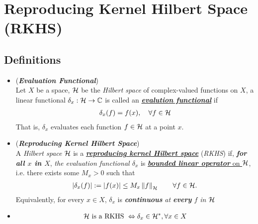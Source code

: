 \documentclass[11pt]{article}
\begin{document}
\section{Reproducing Kernel Hilbert Space (RKHS)}
\subsection{Definitions}
\begin{itemize}
\item \begin{definition} (\textbf{\emph{Evaluation Functional}})\\
Let $X$ be a space, ${\mathcal H}$ be the \emph{Hilbert space} of complex-valued functions on $X$,  a linear functional $\delta_x: {\mathcal H} \rightarrow {\mathbb C}$ is called an \underline{\emph{\textbf{evalution functional}}} if 
\begin{align*}
\delta_x(f) = f(x), \quad \forall f \in {\mathcal H}
\end{align*} That is, $\delta_x$ evaluates each function $f \in {\mathcal H}$ at a point $x$.
\end{definition}

\item \begin{definition} (\emph{\textbf{Reproducing Kernel Hilbert Space}})\\
A \emph{Hilbert space} ${\mathcal H}$ is a \underline{\emph{\textbf{reproducing kernel Hilbert space}}} (\emph{RKHS}) if, \emph{\textbf{for all $x$ in $X$}}, \emph{the evaluation functional $\delta_x$} is \underline{\emph{\textbf{bounded linear operator}} on ${\mathcal H}$}, i.e. there exists some $M_{x}>0$ such that
\begin{align*}
\left\lvert \delta_x(f)  \right\rvert := \left\lvert f(x) \right\rvert \le M_{x}\left\|f\right\|_{{\mathcal H}}\qquad \forall f\in {\mathcal H}.\,
\end{align*} 
Equivalently, for every $x\in X$, $\delta_x$ is \emph{\textbf{continuous}} \emph{at \textbf{every} $f$ in ${\mathcal H}$} 
\end{definition}



\item \begin{remark}
\begin{align*}
{\mathcal H} \text{ is a RKHS } \Leftrightarrow \delta_x \in {\mathcal H}^{*}, \forall x \in X
\end{align*}
\end{remark}


\end{itemize}
\end{document}
